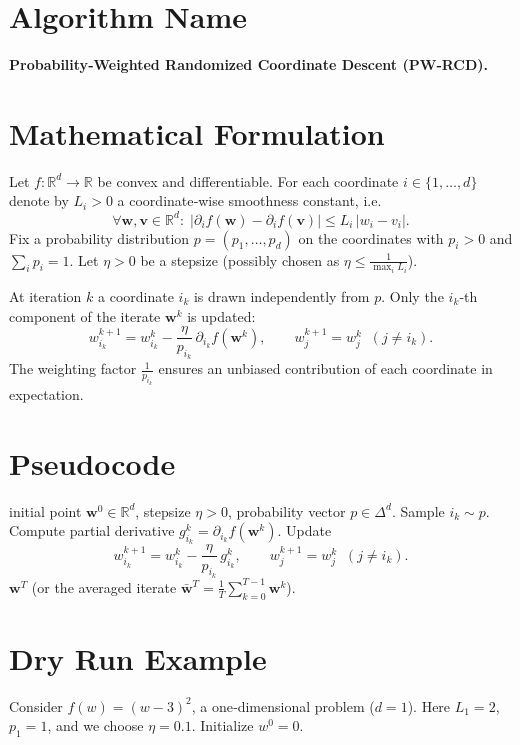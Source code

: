 \documentclass{article}
\newcommand{\R}{\mathbb{R}}
\begin{document}
\section*{Algorithm Name}
\textbf{Probability‑Weighted Randomized Coordinate Descent (PW‑RCD).}

\section*{Mathematical Formulation}
Let $f:\R^{d}\to\R$ be convex and differentiable.  
For each coordinate $i\in\{1,\dots ,d\}$ denote by $L_i>0$ a coordinate‑wise smoothness constant, i.e.
\[
\forall \bm w,\bm v\in\R^{d}:\;
\big| \partial_i f(\bm w)-\partial_i f(\bm v)\big|
\le L_i\,|w_i-v_i| .\tag{1}
\]
Fix a probability distribution $p=(p_1,\dots ,p_d)$ on the coordinates with $p_i>0$ and $\sum_i p_i=1$.  
Let $\eta>0$ be a stepsize (possibly chosen as $\eta\le \frac{1}{\max_i L_i}$).  

At iteration $k$ a coordinate $i_k$ is drawn independently from $p$.  
Only the $i_k$‑th component of the iterate $\bm w^k$ is updated:
\[
\boxed{\;
w^{k+1}_{i_k}=w^{k}_{i_k}-\frac{\eta}{p_{i_k}}\,
\partial_{i_k}f(\bm w^{k}),\qquad
w^{k+1}_{j}=w^{k}_{j}\;\;(j\neq i_k).
\;}
\tag{2}
\]
The weighting factor $\frac{1}{p_{i_k}}$ ensures an unbiased contribution of each coordinate in expectation.

\section*{Pseudocode}
\begin{algorithm}[H]
\caption{Probability‑Weighted Randomized Coordinate Descent}
\begin{algorithmic}[1]
\REQUIRE initial point $\bm w^{0}\in\R^{d}$, stepsize $\eta>0$, probability vector $p\in\Delta^{d}$.
    \STATE Sample $i_k\sim p$.
    \STATE Compute partial derivative $g_{i_k}^{k}= \partial_{i_k}f(\bm w^{k})$.
    \STATE Update
    \[
    w^{k+1}_{i_k}=w^{k}_{i_k}-\frac{\eta}{p_{i_k}}\,g_{i_k}^{k},
    \qquad
    w^{k+1}_{j}=w^{k}_{j}\;\;(j\neq i_k).
    \]
\ENDFOR
\RETURN $\bm w^{T}$ (or the averaged iterate $\bar{\bm w}^{T}=\tfrac1T\sum_{k=0}^{T-1}\bm w^{k}$).
\end{algorithmic}
\end{algorithm}

\section*{Dry Run Example}
Consider $f(w)=(w-3)^{2}$, a one‑dimensional problem ($d=1$).  
Here $L_{1}=2$, $p_{1}=1$, and we choose $\eta=0.1$.  
Initialize $w^{0}=0$.
\end{document}

